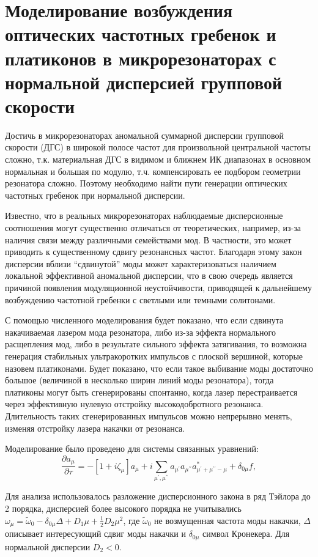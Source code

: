 \section{Моделирование возбуждения оптических частотных гребенок и платиконов в микрорезонаторах с нормальной дисперсией групповой скорости}

Достичь в микрорезонаторах аномальной суммарной дисперсии групповой скорости (ДГС) в широкой полосе частот для произвольной центральной частоты сложно, т.к. материальная ДГС в видимом и ближнем ИК диапазонах в основном нормальная и большая по модулю, т.ч. компенсировать ее подбором геометрии резонатора сложно. Поэтому необходимо найти пути генерации оптических частотных гребенок при нормальной дисперсии.

Известно, что в реальных микрорезонаторах наблюдаемые дисперсионные соотношения могут существенно отличаться от теоретических, например, из-за наличия связи между различными семействами мод. В частности, это может приводить к существенному сдвигу резонансных частот. Благодаря этому закон дисперсии вблизи “сдвинутой” моды может характеризоваться наличием локальной эффективной аномальной дисперсии, что в свою очередь является причиной появления модуляционной неустойчивости, приводящей к дальнейшему возбуждению частотной гребенки с светлыми или темными солитонами.

С помощью численного моделирования будет показано, что если сдвинута накачиваемая лазером мода резонатора, либо из-за эффекта нормального расщепления мод, либо в результате сильного эффекта затягивания, то возможна генерация стабильных ультракоротких импульсов с плоской вершиной, которые назовем платиконами. Будет показано, что если такое выбивание моды достаточно большое (величиной в несколько ширин линий моды резонатора), тогда платиконы могут быть сгенерированы спонтанно, когда лазер перестраивается через эффективную нулевую отстройку высокодобротного резонанса. Длительность таких сгенерированных импульсов можно непрерывно менять, изменяя отстройку лазера накачки от резонанса.

Моделирование было проведено для системы связанных уравнений:
%
\begin{equation}
\frac{\partial a_\mu}{\partial \tau}=-[1+i\zeta_{\mu}]a_\mu+i\sum_{\mu^\prime,\mu^{\prime\prime}} a_{\mu^\prime}a_{\mu^{\prime\prime}}a_{\mu^\prime+\mu^{\prime\prime}-\mu}^*+\delta_{0\mu}f,
\end{equation}

Для анализа использовалось разложение дисперсионного закона в ряд Тэйлора до 2 порядка, дисперсией более высокого порядка не учитывались $\omega_\mu=\tilde\omega_0-\delta_{0\mu}\Delta+D_1\mu+\frac{1}{2}D_2\mu^2$,  где $\tilde\omega_0$ не возмущенная частота моды накачки, $\Delta$ описывает интересующий сдвиг моды накачки и $\delta_{0\mu}$ символ Кронекера. Для нормальной дисперсии $D_2<0$.

